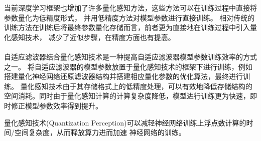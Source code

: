当前深度学习框架也增加了许多量化感知方法，这些方法可以在训练过程中直接将参数量化为低精度形式，
并用低精度方法对模型参数进行直接训练。
相对传统的训练方法在训练后将最终参数量化存储而言，前者更为直接地在训练过程中引入量化感知技术，
减少了近似步骤，在精度方面也有提高。

\paragraph{}

自适应滤波器结合量化感知技术是一种提高自适应滤波器模型参数训练效率的方式之一。
将自适应滤波器的模型参数放置于量化感知技术的框架下进行训练，例如搭建量化神经网络还原滤波器结构并搭建相应量化参数的优化算法，最终进行训练。
量化感知技术由于其存储格式上的低精度处理，可以有效地降低存储结构的空间消耗。同时由于量化感知计算的计算复杂度降低，模型进行训练更为快速，即时修正模型参数效率得到提升。

量化感知技术(Quantization Perception)可以减轻神经网络训练上浮点数计算的时间/空间复杂度，从而释放算力进而加速
神经网络的训练。




